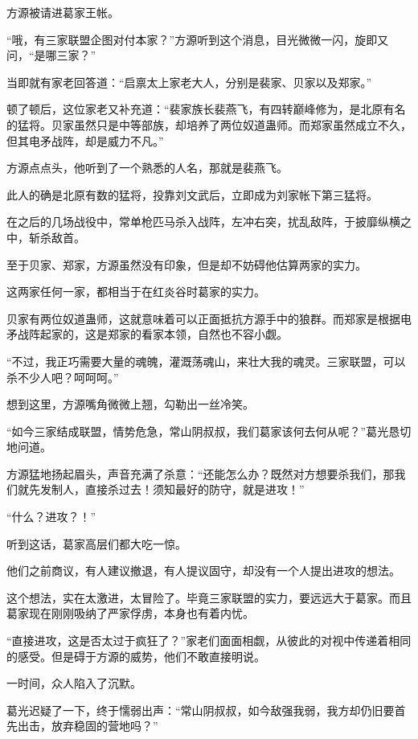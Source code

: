 
\begin{this_body}

方源被请进葛家王帐。

“哦，有三家联盟企图对付本家？”方源听到这个消息，目光微微一闪，旋即又问，“是哪三家？”

当即就有家老回答道：“启禀太上家老大人，分别是裴家、贝家以及郑家。”

顿了顿后，这位家老又补充道：“裴家族长裴燕飞，有四转巅峰修为，是北原有名的猛将。贝家虽然只是中等部族，却培养了两位奴道蛊师。而郑家虽然成立不久，但其电矛战阵，却是威力不凡。”

方源点点头，他听到了一个熟悉的人名，那就是裴燕飞。

此人的确是北原有数的猛将，投靠刘文武后，立即成为刘家帐下第三猛将。

在之后的几场战役中，常单枪匹马杀入战阵，左冲右突，扰乱敌阵，于披靡纵横之中，斩杀敌首。

至于贝家、郑家，方源虽然没有印象，但是却不妨碍他估算两家的实力。

这两家任何一家，都相当于在红炎谷时葛家的实力。

贝家有两位奴道蛊师，这就意味着可以正面抵抗方源手中的狼群。而郑家是根据电矛战阵起家的，这是郑家的看家本领，自然也不容小觑。

“不过，我正巧需要大量的魂魄，灌溉荡魂山，来壮大我的魂灵。三家联盟，可以杀不少人吧？呵呵呵。”

想到这里，方源嘴角微微上翘，勾勒出一丝冷笑。

“如今三家结成联盟，情势危急，常山阴叔叔，我们葛家该何去何从呢？”葛光恳切地问道。

方源猛地扬起眉头，声音充满了杀意：“还能怎么办？既然对方想要杀我们，那我们就先发制人，直接杀过去！须知最好的防守，就是进攻！”

“什么？进攻？！”

听到这话，葛家高层们都大吃一惊。

他们之前商议，有人建议撤退，有人提议固守，却没有一个人提出进攻的想法。

这个想法，实在太激进，太冒险了。毕竟三家联盟的实力，要远远大于葛家。而且葛家现在刚刚吸纳了严家俘虏，本身也有着内忧。

“直接进攻，这是否太过于疯狂了？”家老们面面相觑，从彼此的对视中传递着相同的感受。但是碍于方源的威势，他们不敢直接明说。

一时间，众人陷入了沉默。

葛光迟疑了一下，终于懦弱出声：“常山阴叔叔，如今敌强我弱，我方却仍旧要首先出击，放弃稳固的营地吗？”


\end{this_body}
